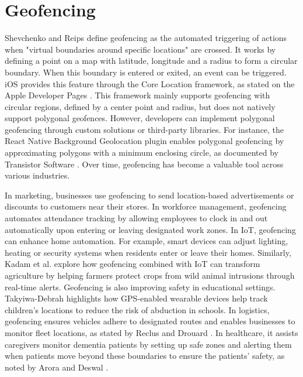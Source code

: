 \section{Geofencing}
Shevchenko and Reips \cite{shevchenko2024geofencing} define geofencing as the automated triggering of actions when "virtual boundaries around specific locations" are crossed. 
It works by defining a point on a map with latitude, longitude and a radius to form a circular boundary. 
When this boundary is entered or exited, an event can be triggered.  
iOS provides this feature through the Core Location framework, as stated on the Apple Developer Pages \cite{apple_geofencing}. 
This framework mainly supports geofencing with circular regions, defined by a center point and radius, but does not natively support polygonal geofences. 
However, developers can implement polygonal geofencing through custom solutions or third-party libraries. 
For instance, the React Native Background Geolocation plugin enables polygonal geofencing by approximating polygons with a minimum enclosing circle, as documented by Transistor Software \cite{transistorsoft_geofence}.  
Over time, geofencing has become a valuable tool across various industries.  

In marketing, businesses use geofencing to send location-based advertisements or discounts to customers near their stores. 
In workforce management, geofencing automates attendance tracking by allowing employees to clock in and out automatically upon entering or leaving designated work zones.  
In \acs{IoT}, geofencing can enhance home automation. 
For example, smart devices can adjust lighting, heating or security systems when residents enter or leave their homes. 
Similarly, Kadam et al. \cite{kadam2020crops} explore how geofencing combined with \acs{IoT} can transform agriculture by helping farmers protect crops from wild animal intrusions through real-time alerts.  
Geofencing is also improving safety in educational settings. 
Takyiwa-Debrah \cite{takyiwa2023geofence} highlights how \acs{GPS}-enabled wearable devices help track children's locations to reduce the risk of abduction in schools. 
In logistics, geofencing ensures vehicles adhere to designated routes and enables businesses to monitor fleet locations, as stated by Reclus and Drouard \cite{reclus2009fleet}. 
In healthcare, it assists caregivers monitor dementia patients by setting up safe zones and alerting them when patients move beyond these boundaries to ensure the patients' safety, as noted by Arora and Deswal \cite{arora2023location}.

